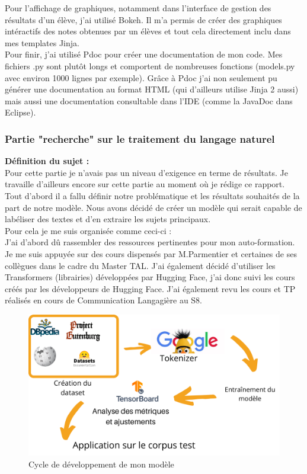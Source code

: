 \documentclass[12pt]{article}
\begin{document}
Pour l'affichage de graphiques, notamment dans l'interface de gestion des résultats d'un élève, j'ai utilisé Bokeh. Il m'a permis de créer des graphiques intéractifs des notes obtenues par un élèves et tout cela directement inclu dans mes templates Jinja. \\

Pour finir, j'ai utilisé Pdoc pour créer une documentation de mon code. Mes fichiers .py sont plutôt longs et comportent de nombreuses fonctions (models.py avec environ 1000 lignes par exemple). Grâce à Pdoc j'ai non seulement pu générer une documentation au format HTML (qui d'ailleurs utilise Jinja 2 aussi) mais aussi une documentation consultable dans l'IDE (comme la JavaDoc dans Eclipse).


\subsubsection{Partie "recherche" sur le traitement du langage naturel}
\textbf{Définition du sujet :} \\
Pour cette partie je n'avais pas un niveau d'exigence en terme de résultats. Je travaille d'ailleurs encore sur cette partie au moment où je rédige ce rapport. \\
Tout d'abord il a fallu définir notre problématique et les résultats souhaités de la part de notre modèle. Nous avons décidé de créer un modèle qui serait capable de labéliser des textes et d'en extraire les sujets principaux. \\

Pour cela je me suis organisée comme ceci-ci : \\
J'ai d'abord dû rassembler des ressources pertinentes pour mon auto-formation. Je me suis appuyée sur des cours dispensés par M.Parmentier et certaines de ses collègues dans le cadre du Master TAL. J'ai également décidé d'utiliser les Transformers (librairies) développées par Hugging Face, j'ai donc suivi les cours créés par les développeurs de Hugging Face. J'ai également revu les cours et TP réalisés en cours de Communication Langagière au S8. \\


\begin{figure}[h]
    \centering
    \includegraphics[scale=0.3]{graphe NLP.png}
    \caption{Cycle de développement de mon modèle}
    \label{fig:NLP}
\end{figure}
\end{document}

